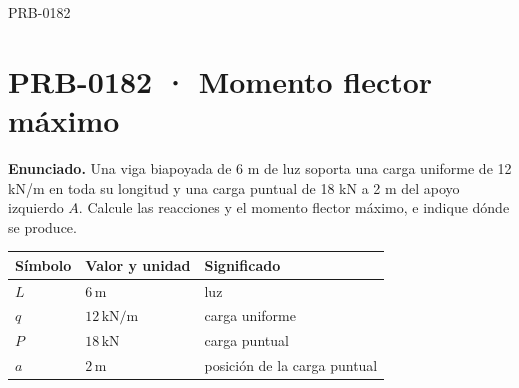 \begin{studiumworked}{PRB-0182}

\section{PRB-0182 · Momento flector máximo}

\textbf{Enunciado.} Una viga biapoyada de 6 m de luz soporta una carga uniforme de 12 kN/m en toda su longitud y una carga puntual de 18 kN a 2 m del apoyo izquierdo $A$. Calcule las reacciones y el momento flector máximo, e indique dónde se produce.

\par\medskip\noindent\begin{tabular}{@{}p{.18\linewidth}p{.26\linewidth}p{.48\linewidth}@{}}
\toprule Símbolo & Valor y unidad & Significado\\\midrule
$L$ & $6\,\mathrm{m}$ & luz\\
$q$ & $12\,\mathrm{kN/m}$ & carga uniforme\\
$P$ & $18\,\mathrm{kN}$ & carga puntual\\
$a$ & $2\,\mathrm{m}$ & posición de la carga puntual\\
\bottomrule\end{tabular}\par\medskip


\end{studiumworked}
